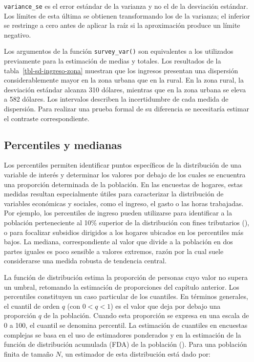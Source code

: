\documentclass[
  spanish,
  11pt,
  letterpaper,
  oneside,
  open=any]{scrbook}
\begin{document}
\texttt{variance\_se} es el error estándar de la varianza y no el de la
desviación estándar. Los límites de esta última se obtienen
transformando los de la varianza; el inferior se restringe a cero antes
de aplicar la raíz si la aproximación produce un límite negativo.

Los argumentos de la función \texttt{survey\_var()} son equivalentes a
los utilizados previamente para la estimación de medias y totales. Los
resultados de la tabla~\ref{tbl-sd-ingreso-zona} muestran que los
ingresos presentan una dispersión considerablemente mayor en la zona
urbana que en la rural. En la zona rural, la desviación estándar alcanza
310 dólares, mientras que en la zona urbana se eleva a 582 dólares. Los
intervalos describen la incertidumbre de cada medida de dispersión. Para
realizar una prueba formal de su diferencia se necesitaría estimar el
contraste correspondiente.

\subsection{Percentiles y medianas}\label{sec-estimacion-de-percentiles}

Los percentiles permiten identificar puntos específicos de la
distribución de una variable de interés y determinar los valores por
debajo de los cuales se encuentra una proporción determinada de la
población. En las encuestas de hogares, estas medidas resultan
especialmente útiles para caracterizar la distribución de variables
económicas y sociales, como el ingreso, el gasto o las horas trabajadas.
Por ejemplo, los percentiles de ingreso pueden utilizarse para
identificar a la población perteneciente al 10\% superior de la
distribución con fines tributarios
(), o para focalizar
subsidios dirigidos a los hogares ubicados en los percentiles más bajos.
La mediana, correspondiente al valor que divide a la población en dos
partes iguales es poco sensible a valores extremos, razón por la cual
suele considerarse una medida robusta de tendencia central.

La función de distribución estima la proporción de personas cuyo valor
no supera un umbral, retomando la estimación de proporciones del
capítulo anterior. Los percentiles constituyen un caso particular de los
cuantiles. En términos generales, el cuantil de orden \(q\) (con
\(0 < q < 1\)) es el valor que deja por debajo una proporción \(q\) de
la población. Cuando esta proporción se expresa en una escala de 0 a
100, el cuantil se denomina percentil. La estimación de cuantiles en
encuestas complejas se basa en el uso de estimadores ponderados y en la
estimación de la función de distribución acumulada (FDA) de la población
(). Para una población finita de tamaño \(N\), un estimador de esta
distribución está dado por:
\end{document}

